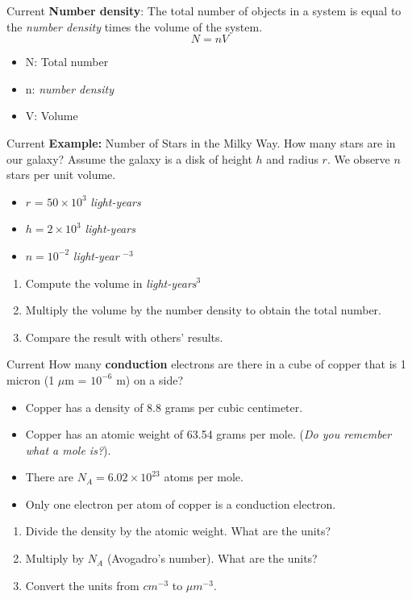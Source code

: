 \documentclass{beamer}
\begin{document}
\begin{frame}{Current}
\textbf{Number density}: The total number of objects in a system is equal to the \textit{number density} times the volume of the system.
\begin{equation}
N = nV
\end{equation}
\begin{itemize}
\item N: Total number
\item n: \textit{number density}
\item V: Volume
\end{itemize}
\end{frame}

\begin{frame}{Current}
\textbf{Example:} \alert{Number of Stars in the Milky Way}.  How many stars are in our galaxy?  Assume the galaxy is a disk of height $h$ and radius $r$.  We observe $n$ stars per unit volume.
\begin{itemize}
\item $r$ = $50 \times 10^3$ \textit{light-years}
\item $h = 2 \times 10^3$ \textit{light-years}
\item $n = 10^{-2}$ \textit{light-year} $^{-3}$
\end{itemize}
\begin{enumerate}
\item Compute the volume in \textit{light-years}$^3$
\item Multiply the volume by the number density to obtain the total number.
\item Compare the result with others' results.
\end{enumerate}
\end{frame}

\begin{frame}{Current}
\small
How many \textbf{conduction} electrons are there in a cube of copper that is 1 micron (1 $\mu$m = $10^{-6}$ m) on a side?
\begin{itemize}
\item Copper has a density of 8.8 grams per cubic centimeter.
\item Copper has an atomic weight of 63.54 grams per mole.  (\textit{Do you remember what a mole is?}).
\item There are $N_A = 6.02 \times 10^{23}$ atoms per mole.
\item Only one electron per atom of copper is a conduction electron.
\end{itemize} \hrulefill
\begin{enumerate}
\item Divide the density by the atomic weight.  What are the units?
\item Multiply by $N_A$ (Avogadro's number).  What are the units?
\item Convert the units from $cm^{-3}$ to $\mu m^{-3}$.
\end{enumerate}
\end{frame}
\end{document}
